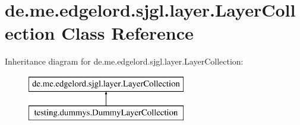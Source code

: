 \hypertarget{classde_1_1me_1_1edgelord_1_1sjgl_1_1layer_1_1_layer_collection}{}\section{de.\+me.\+edgelord.\+sjgl.\+layer.\+Layer\+Collection Class Reference}
\label{classde_1_1me_1_1edgelord_1_1sjgl_1_1layer_1_1_layer_collection}
Inheritance diagram for de.\+me.\+edgelord.\+sjgl.\+layer.\+Layer\+Collection\+:\begin{figure}[H]
\begin{center}
\leavevmode
\includegraphics[height=2.000000cm]{classde_1_1me_1_1edgelord_1_1sjgl_1_1layer_1_1_layer_collection}
\end{center}
\end{figure}
